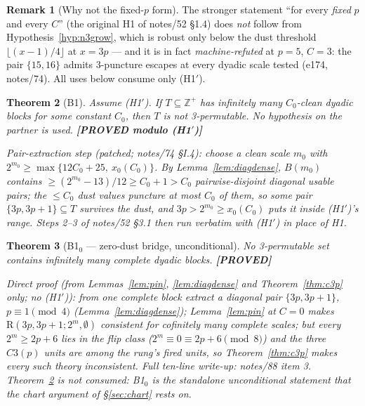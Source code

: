 \documentclass[11pt]{article}
\newtheorem{theorem}{Theorem}
\theoremstyle{definition}
\newtheorem{remark}[theorem]{Remark}
\newcommand{\Z}{\mathbb{Z}}
\newcommand{\Rung}{\mathrm{R}}
\newcommand{\status}[1]{\textbf{[#1]}}
\begin{document}
\begin{remark}[Why not the fixed-$p$ form]\label{rem:h1prime}
The stronger statement ``for every \emph{fixed} $p$ and every $C$''
(the original H1 of notes/52 \S1.4) does \emph{not} follow from
Hypothesis~\ref{hyp:n3grow}, which is robust only below the dust
threshold $\lfloor (x-1)/4 \rfloor$ at $x = 3p$ --- and it is in fact
\emph{machine-refuted} at $p = 5$, $C = 3$: the pair $\{15,16\}$ admits
3-puncture escapes at every dyadic scale tested (e174, notes/74).  All
uses below consume only (H1$'$).
\end{remark}

\begin{theorem}[B1]\label{thm:b1}
Assume \emph{(H1$'$)}.  If $T \subseteq \Z^+$ has infinitely many $C_0$-clean
dyadic blocks for some constant $C_0$, then $T$ is not 3-permutable.  No
hypothesis on the partner is used.  \status{PROVED modulo (H1$'$)}
\end{theorem}

\noindent\emph{Pair-extraction step (patched; notes/74 \S I.4): choose a
clean scale $m_0$ with $2^{m_0} \ge \max\{12C_0+25,\ x_0(C_0)\}$.  By
Lemma~\ref{lem:diagdense}, $B(m_0)$ contains $\ge (2^{m_0}-13)/12 \ge
C_0+1 > C_0$ pairwise-disjoint diagonal usable pairs; the $\le C_0$ dust
values puncture at most $C_0$ of them, so some pair
$\{3p, 3p+1\} \subseteq T$ survives the dust, and $3p > 2^{m_0} \ge
x_0(C_0)$ puts it inside (H1$'$)'s range.  Steps 2--3 of notes/52 \S3.1
then run verbatim with (H1$'$) in place of H1.}

\begin{theorem}[B1$_0$ --- zero-dust bridge, unconditional]\label{cor:b1zero}
No 3-permutable set contains infinitely many complete dyadic blocks.
\status{PROVED}
\end{theorem}

\noindent\emph{Direct proof (from Lemmas~\ref{lem:pin},
\ref{lem:diagdense} and Theorem~\ref{thm:c3p} only; no (H1$'$)): from one
complete block extract a diagonal pair $\{3p, 3p+1\}$, $p \equiv 1
\pmod 4$ (Lemma~\ref{lem:diagdense}); Lemma~\ref{lem:pin} at $C = 0$
makes $\Rung(3p, 3p+1; 2^m, \emptyset)$ consistent for cofinitely many
complete scales; but every $2^m \ge 2p+6$ lies in the flip class
($2^m \equiv 0 \equiv 2p+6 \pmod 8$) and the three $C3(p)$ units are
among the rung's fired units, so Theorem~\ref{thm:c3p} makes every such
theory inconsistent.  Full ten-line write-up: notes/88 item 3.
Theorem~\ref{thm:b1} is \emph{not} consumed: B1$_0$ is the standalone
unconditional statement that the chart argument of \S\ref{sec:chart}
rests on.}
\end{document}
